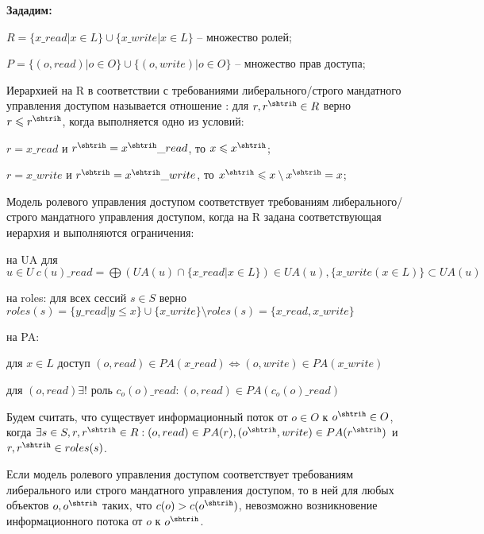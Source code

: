 \textbf{Зададим:}
\begin{enumerate*}
	\item $R = \{x\_read | x \in L\} \cup \{x\_write | x \in L\}$ -- множество ролей;
	\item $P = \{(o,read) | o \in O\} \cup \{(o,write) | o \in O\}$ -- множество прав доступа;
\end{enumerate*}


\begin{defs}[Иерархия на R]
	Иерархией на R в соответствии с требованиями либерального/строго мандатного управления доступом называется отношение \kav{$\leqslant$} : для $r, r^{\shtrih} \in R$ верно $r \leqslant r^{\shtrih}$, когда выполняется
	одно из условий:
		\begin{itemize*}
			\item $r = x\_read$ и $r^{\shtrih} = x^{\shtrih}\_read$, то $x \leqslant x^{\shtrih}$;
			\item $r = x\_write$ и $r^{\shtrih} = x^{\shtrih}\_write$, то $x^{\shtrih} \leqslant x \setminus x^{\shtrih} = x$;
		\end{itemize*}
\end{defs}

\begin{defs}
	Модель ролевого управления доступом соответствует требованиям либерального/строго мандатного управления доступом, когда на R задана соответствующая иерархия и выполняются ограничения:
		\begin{itemize*}
			\item на UA для $u \in U \ c(u)\_read = \bigoplus (UA(u) \cap \{x\_read | x \in L\}) \in UA(u), \{x\_write(x \in L)\} \subset UA(u)$
			\item на roles: для всех сессий $s \in S$ верно $roles(s) = \{y\_read | y \leqslant x\} \cup \{x\_write\} \setminus roles(s) = \{x\_read, x\_write\}$
			\item на PA:
				\begin{itemize*}
					\item для $x \in L$ доступ $(o, read) \in PA(x\_read) \Leftrightarrow (o,write) \in PA(x\_write)$
					\item для $(o,read) \exists!$ роль $c_o(o)\_read : (o, read) \in PA(c_o(o)\_read)$
				\end{itemize*}
		\end{itemize*}
\end{defs}

\begin{defs}
	Будем считать, что существует информационный поток от $o \in O$ к $o^{\shtrih} \in O$, когда $\exists s \in S, r, r^{\shtrih} \in R : (o, read) \in PA(r), (o^{\shtrih}, write) \in PA(r^{\shtrih})$
	и $r,r^{\shtrih} \in roles(s)$.
\end{defs}

\begin{proofs}
	Если модель ролевого управления доступом соответствует требованиям либерального или строго мандатного управления доступом, то в ней для любых объектов $o, o^{\shtrih}$ таких, что
	$c(o) > c(o^{\shtrih})$, невозможно возникновение информационного потока от $o$ к $o^{\shtrih}$.
\end{proofs}
